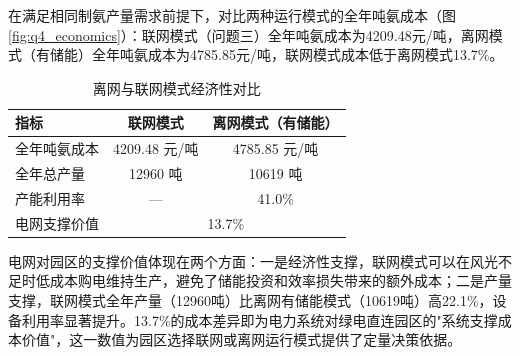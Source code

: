 在满足相同制氨产量需求前提下，对比两种运行模式的全年吨氨成本（图\ref{fig:q4_economics}）：联网模式（问题三）全年吨氨成本为4209.48元/吨，离网模式（有储能）全年吨氨成本为4785.85元/吨，联网模式成本低于离网模式13.7\%。

\begin{table}[H]
\centering
\caption{离网与联网模式经济性对比}\label{tab:q4_economics}
\begin{tabular}{lcc}
\toprule
指标 & 联网模式 & 离网模式（有储能） \\
\midrule
全年吨氨成本 & 4209.48 元/吨 & 4785.85 元/吨 \\
全年总产量 & 12960 吨 & 10619 吨 \\
产能利用率 & --- & 41.0\% \\
电网支撑价值 & \multicolumn{2}{c}{13.7\%} \\
\bottomrule
\end{tabular}
\end{table}

电网对园区的支撑价值体现在两个方面：一是经济性支撑，联网模式可以在风光不足时低成本购电维持生产，避免了储能投资和效率损失带来的额外成本；二是产量支撑，联网模式全年产量（12960吨）比离网有储能模式（10619吨）高22.1\%，设备利用率显著提升。13.7\%的成本差异即为电力系统对绿电直连园区的"系统支撑成本价值"，这一数值为园区选择联网或离网运行模式提供了定量决策依据。
